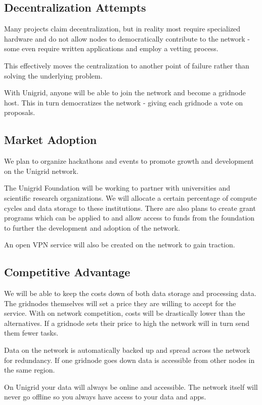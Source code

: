 \documentclass{article}
\begin{document}
\subsection{Decentralization Attempts}
Many projects claim decentralization, but in reality most require specialized hardware and do not allow nodes to democratically contribute to the network - some even require written applications and employ a vetting process.

This effectively moves the centralization to another point of failure rather than solving the underlying problem.

With Unigrid, anyone will be able to join the network and become a gridnode host. This in turn democratizes the network - giving each gridnode a vote on proposals.

\subsection{Market Adoption}
We plan to organize hackathons and events to promote growth and development on the Unigrid network. 

The Unigrid Foundation will be working to partner with universities and scientific research organizations. We will allocate a certain percentage of compute cycles and data storage to these institutions. There are also plans to create grant programs which can be applied to and allow access to funds from the foundation to further the development and adoption of the network.

An open VPN service will also be created on the network to gain traction.

\subsection{Competitive Advantage}
We will be able to keep the costs down of both data storage and processing data. The gridnodes themselves will set a price they are willing to accept for the service. With on network competition, costs will be drastically lower than the alternatives. If a gridnode sets their price to high the network will in turn send them fewer tasks.

Data on the network is automatically backed up and spread across the network for redundancy. If one gridnode goes down data is accessible from other nodes in the same region.

On Unigrid your data will always be online and accessible. The network itself will never go offline so you always have access to your data and apps.
\end{document}
